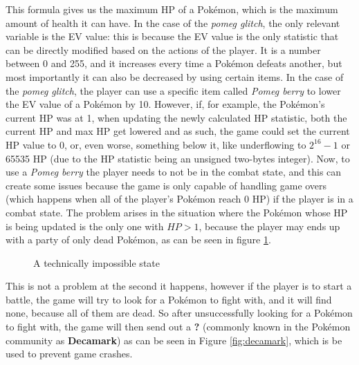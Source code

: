 \documentclass[a4paper]{usiinfbachelorproject}
\begin{document}
This formula gives us the maximum HP of a Pokémon, which is the maximum amount of health it can have. In the case of the \textit{pomeg glitch}, the only relevant variable is the EV value: this is because the EV value is the only statistic that can be directly modified based on the actions of the player. It is a number between 0 and 255, and it increases every time a Pokémon defeats another, but most importantly it can also be decreased by using certain items. In the case of the \textit{pomeg glitch}, the player can use a specific item called \textit{Pomeg berry} to lower the EV value of a Pokémon by 10. However, if, for example, the Pokémon's current HP was at 1, when updating the newly calculated HP statistic, both the current HP and max HP get lowered and as such, the game could set the current HP value to 0, or, even worse, something below it, like underflowing to $ 2^{16}-1$ or 65535 HP (due to the HP statistic being an unsigned two-bytes integer). Now, to use a \textit{Pomeg berry} the player needs to not be in the combat state, and this can create some issues because the game is only capable of handling game overs (which happens when all of the player's Pokémon reach 0 HP) if the player is in a combat state. The problem arises in the situation where the Pokémon whose HP is being updated is the only one with $HP > 1$, because the player may ends up with a party of only dead Pokémon, as can be seen in figure \ref{fig:dead_team}.

\begin{figure}[h!]
	\caption{A technically impossible state}\label{fig:dead_team}
\end{figure}

This is not a problem at the second it happens, however if the player is to start a battle, the game will try to look for a Pokémon to fight with, and it will find none, because all of them are dead. So after unsuccessfully looking for a Pokémon to fight with, the game will then send out a \textbf{?} (commonly known in the Pokémon community as \textbf{Decamark}) as can be seen in Figure \ref{fig:decamark}, which is be used to prevent game crashes.
\end{document}
